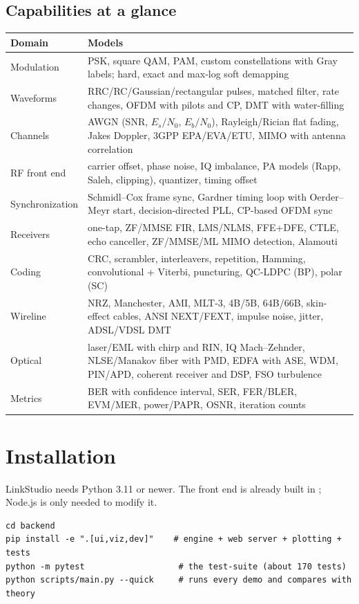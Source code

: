 \subsection{Capabilities at a glance}
\begin{center}
\small
\begin{tabularx}{\textwidth}{@{}lX@{}}
\toprule
\textbf{Domain} & \textbf{Models} \\
\midrule
Modulation & PSK, square QAM, PAM, custom constellations with Gray labels; hard, exact and max-log soft demapping\\
Waveforms & RRC/RC/Gaussian/rectangular pulses, matched filter, rate changes, OFDM with pilots and CP, DMT with water-filling\\
Channels & AWGN (SNR, $E_s/N_0$, $E_b/N_0$), Rayleigh/Rician flat fading, Jakes Doppler, 3GPP EPA/EVA/ETU, MIMO with antenna correlation\\
RF front end & carrier offset, phase noise, IQ imbalance, PA models (Rapp, Saleh, clipping), quantizer, timing offset\\
Synchronization & Schmidl--Cox frame sync, Gardner timing loop with Oerder--Meyr start, decision-directed PLL, CP-based OFDM sync\\
Receivers & one-tap, ZF/MMSE FIR, LMS/NLMS, FFE+DFE, CTLE, echo canceller, ZF/MMSE/ML MIMO detection, Alamouti\\
Coding & CRC, scrambler, interleavers, repetition, Hamming, convolutional + Viterbi, puncturing, QC-LDPC (BP), polar (SC)\\
Wireline & NRZ, Manchester, AMI, MLT-3, 4B/5B, 64B/66B, skin-effect cables, ANSI NEXT/FEXT, impulse noise, jitter, ADSL/VDSL DMT\\
Optical & laser/EML with chirp and RIN, IQ Mach--Zehnder, NLSE/Manakov fiber with PMD, EDFA with ASE, WDM, PIN/APD, coherent receiver and DSP, FSO turbulence\\
Metrics & BER with confidence interval, SER, FER/BLER, EVM/MER, power/PAPR, OSNR, iteration counts\\
\bottomrule
\end{tabularx}
\end{center}

\section{Installation}
LinkStudio needs Python 3.11 or newer. The front end is already built in
; Node.js is only needed to modify it.
\begin{lstlisting}[style=shell]
cd backend
pip install -e ".[ui,viz,dev]"    # engine + web server + plotting + tests
python -m pytest                   # the test-suite (about 170 tests)
python scripts/main.py --quick     # runs every demo and compares with theory
\end{lstlisting}

